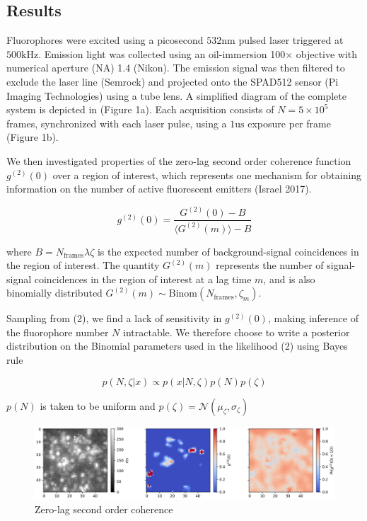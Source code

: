 \documentclass[a4paper, twocolumn, superscriptaddress,prl]{revtex4}  %
\begin{document}
\subsection{Results}

Fluorophores were excited using a picosecond $532\mathrm{nm}$ pulsed laser triggered at $500\mathrm{kHz}$. Emission light was collected using an oil-immersion 100$\times$ objective with numerical aperture (NA) 1.4 (Nikon). The emission signal was then filtered to exclude the laser line (Semrock) and projected onto the SPAD512 sensor (Pi Imaging Technologies) using a tube lens. A simplified diagram of the complete system is depicted in (Figure 1a). Each acquisition consists of $N=5\times 10^{5}$ frames, synchronized with each laser pulse, using a $1\mathrm{us}$ exposure per frame (Figure 1b). 

We then investigated properties of the zero-lag second order coherence function $g^{(2)}(0)$ over a region of interest, which represents one mechanism for obtaining information on the number of active fluorescent emitters (Israel 2017). 

\begin{equation}
g^{(2)}(0) = \frac{G^{(2)}(0)-B}{\langle G^{(2)}(m)\rangle -B}
\end{equation}

where $B = N_{\mathrm{frames}}\lambda\zeta$ is the expected number of background-signal coincidences in the region of interest. The quantity $G^{(2)}(m)$ represents the number of signal-signal coincidences in the region of interest at a lag time $m$, and is also binomially distributed $G^{(2)}(m)\sim \mathrm{Binom}(N_{\mathrm{frames}},\zeta_{m})$.

Sampling from (2), we find a lack of sensitivity in $g^{(2)}(0)$, making inference of the fluorophore number $N$ intractable. We therefore choose to write a posterior distribution on the Binomial parameters used in the likelihood (2) using Bayes rule

\begin{equation*}
p(N,\zeta|x) \propto p(x|N,\zeta)p(N)p(\zeta)
\end{equation*}

$p(N)$ is taken to be uniform and $p(\zeta) = \mathcal{N}(\mu_{\zeta},\sigma_{\zeta})$


\begin{figure}
\includegraphics[width=16cm]{Figure-2.png}
\caption{Zero-lag second order coherence}
\end{figure}  
\end{document}
